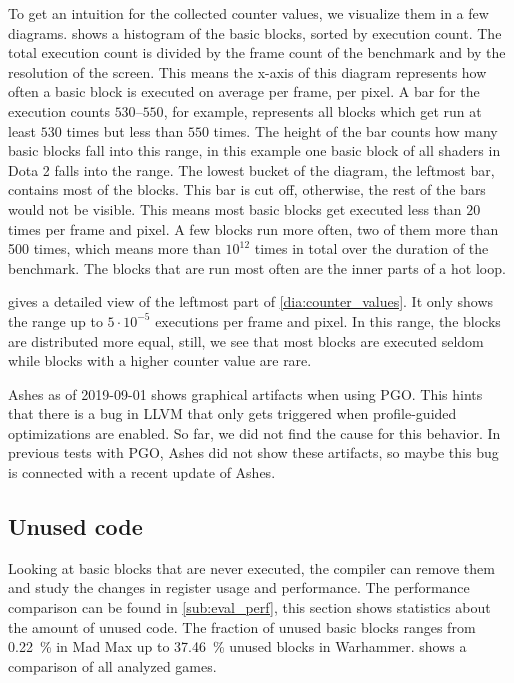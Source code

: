 To get an intuition for the collected counter values, we visualize them in a few diagrams.
 shows a histogram of the basic blocks, sorted by execution count.
The total execution count is divided by the frame count of the benchmark and by the resolution of the screen.
This means the x-axis of this diagram represents how often a basic block is executed on average per frame, per pixel.
A bar for the execution counts $530$--$550$, for example, represents all blocks which get run at least $530$ times but less than $550$ times.
The height of the bar counts how many basic blocks fall into this range, in this example one basic block of all shaders in Dota 2 falls into the range.
The lowest bucket of the diagram, the leftmost bar, contains most of the blocks.
This bar is cut off, otherwise, the rest of the bars would not be visible.
This means most basic blocks get executed less than $20$ times per frame and pixel.
A few blocks run more often, two of them more than 500 times, which means more than $10^{12}$ times in total over the duration of the benchmark.
The blocks that are run most often are the inner parts of a hot loop.


 gives a detailed view of the leftmost part of \cref{dia:counter_values}.
It only shows the range up to $5\cdot 10^{-5}$ executions per frame and pixel.
In this range, the blocks are distributed more equal, still, we see that most blocks are executed seldom while blocks with a higher counter value are rare.


Ashes as of 2019-09-01 shows graphical artifacts when using PGO.
This hints that there is a bug in LLVM that only gets triggered when profile-guided optimizations are enabled.
So far, we did not find the cause for this behavior.
In previous tests with PGO, Ashes did not show these artifacts, so maybe this bug is connected with a recent update of Ashes.

\subsection{Unused code}
\label{sub:eval_unused}
Looking at basic blocks that are never executed, the compiler can remove them and study the changes in register usage and performance.
The performance comparison can be found in \cref{sub:eval_perf}, this section shows statistics about the amount of unused code.
The fraction of unused basic blocks ranges from \SI{0.22}{\percent} in Mad Max up to \SI{37.46}{\percent} unused blocks in Warhammer.
 shows a comparison of all analyzed games.


